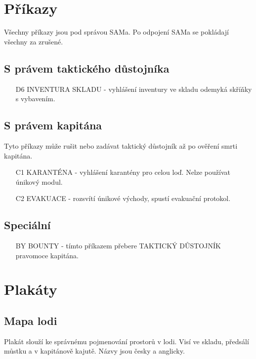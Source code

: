 \documentclass[11pt,oneside,a4paper]{article}
\begin{document}
\section{\texorpdfstring{Příkazy}{Prikazy}}
\label{sec:prikazy}
Všechny příkazy jsou pod správou SAMa. Po odpojení SAMa se pokládají všechny za zrušené.

\subsection{\texorpdfstring{S právem taktického důstojníka}{S pravem taktickeho dustojnika}}
\label{subsec:s_pravem_TD}
\begin{itemize}
\item[D6] INVENTURA SKLADU - vyhlášení inventury ve skladu odemyká skříňky s vybavením.
\end{itemize}
\subsection{\texorpdfstring{S právem kapitána}{S pravem kapitana}}
\label{subsec:s_pravem_KP}
Tyto příkazy může rušit nebo zadávat taktický důstojník až po ověření smrti kapitána.
\begin{itemize}
\item[C1] KARANTÉNA - vyhlášení karantény pro celou loď. Nelze používat únikový modul.
\item[C2] EVAKUACE - rozsvítí únikové východy, spustí evakuační protokol.
\end{itemize}

\subsection{\texorpdfstring{Speciální}{Speciálni}}
\label{subsec:specialni}
\begin{itemize}
\item[BY] BOUNTY - tímto příkazem přebere TAKTICKÝ DŮSTOJNÍK pravomoce kapitána. 
\end{itemize}

\section{\texorpdfstring{Plakáty}{Plakaty}}
\label{sec:plakaty}

\subsection{\texorpdfstring{Mapa lodi}{Mapa lodi}}
\label{subsec:mapa_lodi}
Plakát slouží ke správnému pojmenování prostorů v lodi. Visí ve skladu, předsálí můstku a v kapitánově kajutě. Názvy jsou česky a anglicky.
\end{document}
